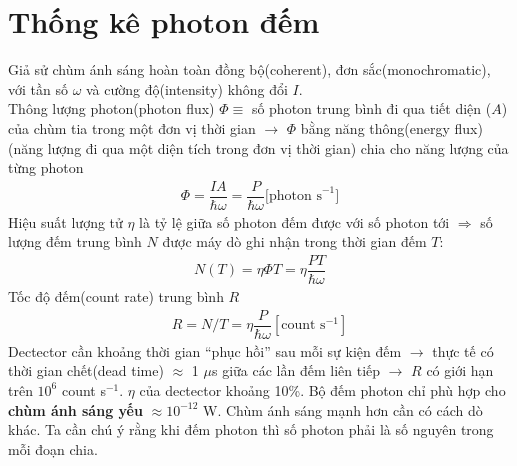 \documentclass{report}
\newcommand{\q}[1]{``#1''
}
\newcommand{\f}[2]{\dfrac{#1}{#2}}
\begin{document}
\section{Thống kê photon đếm}
Giả sử chùm ánh sáng hoàn toàn đồng bộ(coherent), đơn sắc(monochromatic), với tần số $\omega$ và cường độ(intensity) không đổi $I$.\\
Thông lượng photon(photon flux) $\Phi \equiv$ số photon trung bình đi qua tiết diện ($A$) của chùm tia trong một đơn vị thời gian $\rightarrow$ $\Phi$ bằng năng thông(energy flux)(năng lượng đi qua một diện tích trong đơn vị thời gian) chia cho năng lượng của từng photon
\begin{gather}
	\Phi = \f{IA}{\hbar \omega} = \f{P}{\hbar \omega} \text{[photon s}^{-1}]
\end{gather}
Hiệu suất lượng tử $\eta$ là tỷ lệ giữa số photon đếm được với số photon tới
$\Rightarrow$ số lượng đếm trung bình $N$ được máy dò ghi nhận trong thời gian đếm $T$:
\begin{gather}
	N(T) = \eta \Phi T = \eta \f{PT}{\hbar \omega}
\end{gather}
Tốc độ đếm(count rate) trung bình $R$
\begin{gather}
	R = N/T = \eta \f{P}{\hbar \omega} [ \text{count s}^{-1} ]
\end{gather}
Dectector cần khoảng thời gian \q{phục hồi} sau mỗi sự kiện đếm $\rightarrow$ thực tế có thời gian chết(dead time) $\approx$ 1 $\mu$s giữa các lần đếm liên tiếp $\rightarrow$ $R$ có giới hạn trên $10^{6}$ count s$^{-1}$. $\eta$ của dectector khoảng 10\%. Bộ đếm photon chỉ phù hợp cho \textbf{chùm ánh sáng yếu} $\approx 10^{-12}$ W. Chùm ánh sáng mạnh hơn cần có cách dò khác. Ta cần chú ý rằng khi đếm photon thì số photon phải là số nguyên trong mỗi đoạn chia.
\end{document}

